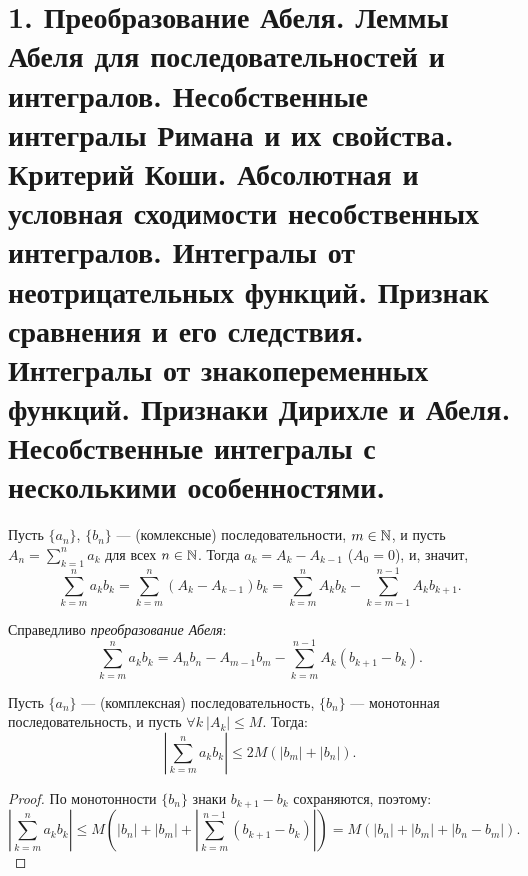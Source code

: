\section{1. Преобразование Абеля. Леммы Абеля для последовательностей и интегралов. Несобственные интегралы Римана и их свойства. Критерий Коши. Абсолютная и условная сходимости несобственных интегралов. Интегралы от неотрицательных функций. Признак сравнения и его следствия. Интегралы от знакопеременных функций. Признаки Дирихле и Абеля. Несобственные интегралы с несколькими особенностями.}

\begin{definition}
    Пусть $\{a_n\}$, $\{b_n\}$ --- (комлексные) последовательности, $m \in \mathbb{N}$, и пусть $A_n = \sum_{k=1}^n a_k$ для всех $n \in \mathbb{N}$. Тогда $a_k = A_k - A_{k-1}$ ($A_0 = 0$), и, значит,
    \[
        \sum_{k=m}^{n} a_k b_k = \sum_{k=m}^n (A_k - A_{k - 1})b_k = \sum_{k=m}^n A_k b_k - \sum_{k = m - 1}^{n - 1} A_k b_{k + 1}.
    \]

    Справедливо \emph{преобразование Абеля}:
    \[
        \sum_{k=m}^n a_k b_k = A_n b_n - A_{m - 1} b_m - \sum_{k = m}^{n - 1} A_k (b_{k + 1} - b_k).
    \]
\end{definition}

\begin{lemma}[Абель]
\label{abel-lemma}
    Пусть $\{a_n\}$ --- (комплексная) последовательность, $\{b_n\}$ --- монотонная последовательность, и пусть $\forall k \ |A_k| \le M$. Тогда:
    \[
        \left|\sum_{k=m}^n a_k b_k \right| \le 2M(|b_m| + |b_n|).
    \]

    \begin{proof}
        По монотонности $\{b_n\}$ знаки $b_{k + 1} - b_k$ сохраняются, поэтому:
        \[
            \left| \sum_{k=m}^n a_k b_k \right| \le M \left(|b_n| + |b_m| + \left| \sum_{k = m}^{n - 1} (b_{k+1} - b_k) \right| \right) = M \left(|b_n| + |b_m| + |b_n - b_m| \right).
        \]
    \end{proof}
\end{lemma}


